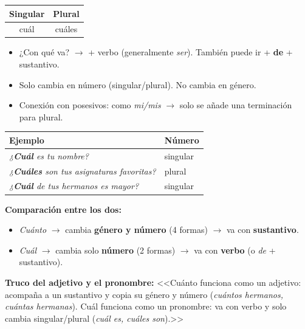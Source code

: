 \documentclass[a4paper,10pt]{article}
\begin{document}
\begin{minipage}[t]{0.45\linewidth}
\begin{center}
\begin{tabular}{|c|c|}
\hline
\rowcolor{naranjainterr!15}
\textbf{Singular} & \textbf{Plural} \\
\hline
cuál & cuáles \\
\hline
\end{tabular}
\end{center}

\vspace{4pt}
\begin{itemize}[nosep, leftmargin=1em, font=\small]
\item ¿Con qué va? $\to$ + verbo (generalmente \textit{ser}). También puede ir + \textbf{de} + sustantivo.
\item Solo cambia en número (singular/plural). No cambia en género.
\item Conexión con posesivos: como \textit{mi/mis} $\to$ solo se añade una terminación para plural.
\end{itemize}
\end{minipage}
\hfill
\begin{minipage}[t]{0.52\linewidth}
\begin{tabular}{|p{5.5cm}|l|}
\hline
\rowcolor{naranjainterr!10}
\textbf{Ejemplo} & \textbf{Número} \\
\hline
\textit{¿\textbf{Cuál} es tu nombre?} & singular \\
\hline
\rowcolor{grisclaro}
\textit{¿\textbf{Cuáles} son tus asignaturas favoritas?} & plural \\
\hline
\textit{¿\textbf{Cuál} de tus hermanos es mayor?} & singular \\
\hline
\end{tabular}
\end{minipage}

\vspace{8pt}

\textbf{Comparación entre los dos:}
\begin{itemize}[nosep, leftmargin=1.2em]
\item \textit{Cuánto} $\to$ cambia \textbf{género y número} (4 formas) $\to$ va con \textbf{sustantivo}.
\item \textit{Cuál} $\to$ cambia solo \textbf{número} (2 formas) $\to$ va con \textbf{verbo} (o \textit{de} + sustantivo).
\end{itemize}

\begin{trucointerr}
\textbf{Truco del adjetivo y el pronombre:} <<Cuánto funciona como un adjetivo: acompaña a un sustantivo y copia su género y número (\textit{cuántos hermanos, cuántas hermanas}). Cuál funciona como un pronombre: va con verbo y solo cambia singular/plural (\textit{cuál es, cuáles son}).>>
\end{trucointerr}
\end{document}
